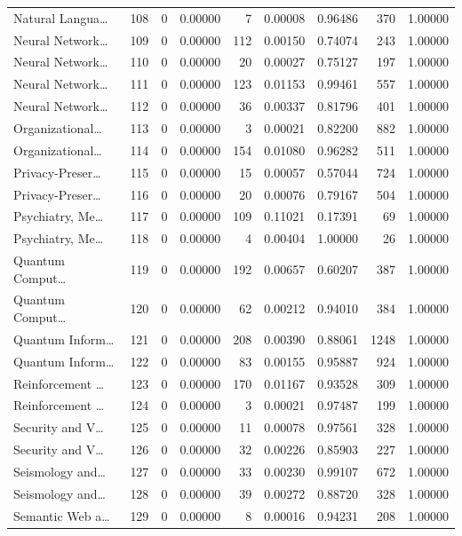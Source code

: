 \begin{table}
\begin{tabular}{lrrrrrrrr}
Natural Langua… & 108 & 0 & 0.00000 & 7 & 0.00008 & 0.96486 & 370 & 1.00000 \\
Neural Network… & 109 & 0 & 0.00000 & 112 & 0.00150 & 0.74074 & 243 & 1.00000 \\
Neural Network… & 110 & 0 & 0.00000 & 20 & 0.00027 & 0.75127 & 197 & 1.00000 \\
Neural Network… & 111 & 0 & 0.00000 & 123 & 0.01153 & 0.99461 & 557 & 1.00000 \\
Neural Network… & 112 & 0 & 0.00000 & 36 & 0.00337 & 0.81796 & 401 & 1.00000 \\
Organizational… & 113 & 0 & 0.00000 & 3 & 0.00021 & 0.82200 & 882 & 1.00000 \\
Organizational… & 114 & 0 & 0.00000 & 154 & 0.01080 & 0.96282 & 511 & 1.00000 \\
Privacy-Preser… & 115 & 0 & 0.00000 & 15 & 0.00057 & 0.57044 & 724 & 1.00000 \\
Privacy-Preser… & 116 & 0 & 0.00000 & 20 & 0.00076 & 0.79167 & 504 & 1.00000 \\
Psychiatry, Me… & 117 & 0 & 0.00000 & 109 & 0.11021 & 0.17391 & 69 & 1.00000 \\
Psychiatry, Me… & 118 & 0 & 0.00000 & 4 & 0.00404 & 1.00000 & 26 & 1.00000 \\
Quantum Comput… & 119 & 0 & 0.00000 & 192 & 0.00657 & 0.60207 & 387 & 1.00000 \\
Quantum Comput… & 120 & 0 & 0.00000 & 62 & 0.00212 & 0.94010 & 384 & 1.00000 \\
Quantum Inform… & 121 & 0 & 0.00000 & 208 & 0.00390 & 0.88061 & 1248 & 1.00000 \\
Quantum Inform… & 122 & 0 & 0.00000 & 83 & 0.00155 & 0.95887 & 924 & 1.00000 \\
Reinforcement … & 123 & 0 & 0.00000 & 170 & 0.01167 & 0.93528 & 309 & 1.00000 \\
Reinforcement … & 124 & 0 & 0.00000 & 3 & 0.00021 & 0.97487 & 199 & 1.00000 \\
Security and V… & 125 & 0 & 0.00000 & 11 & 0.00078 & 0.97561 & 328 & 1.00000 \\
Security and V… & 126 & 0 & 0.00000 & 32 & 0.00226 & 0.85903 & 227 & 1.00000 \\
Seismology and… & 127 & 0 & 0.00000 & 33 & 0.00230 & 0.99107 & 672 & 1.00000 \\
Seismology and… & 128 & 0 & 0.00000 & 39 & 0.00272 & 0.88720 & 328 & 1.00000 \\
Semantic Web a… & 129 & 0 & 0.00000 & 8 & 0.00016 & 0.94231 & 208 & 1.00000 \\

\end{tabular}
\end{table}

